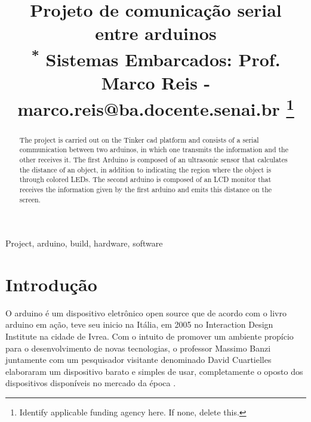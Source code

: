 \documentclass[conference]{IEEEtran}
\begin{document}
\title{Projeto de comunicação serial entre arduinos\\
{\footnotesize \textsuperscript{*} Sistemas Embarcados: Prof. Marco Reis - marco.reis@ba.docente.senai.br}
\thanks{Identify applicable funding agency here. If none, delete this.}
}



\author{

}

\maketitle

\begin{abstract}
    The project is carried out on the Tinker cad platform and consists of a serial communication between two 
    arduinos, in which one transmits the information and the other receives it. The first Arduino is composed
    of an ultrasonic sensor that calculates the distance of an object, in addition to indicating the region where
    the object is through colored LEDs. The second arduino is composed of an LCD monitor that receives the
    information given by the first arduino and emits this distance on the screen.
\end{abstract}

\begin{IEEEkeywords}
Project, arduino, build, hardware, software 
\end{IEEEkeywords}

\section{Introdução}
O arduino é um dispositivo eletrônico open source que de acordo com o livro arduino em ação, teve seu inicio na Itália, 
em 2005 no Interaction Design Institute na cidade de Ivrea. Com o intuito de promover um ambiente propício para o
desenvolvimento de novas tecnologias, o professor Massimo Banzi juntamente com um pesquisador visitante denominado
David Cuartielles elaboraram um dispositivo barato e simples de usar, completamente o oposto dos dispositivos 
disponíveis no mercado da época \cite{evans2013}.
\end{document}
